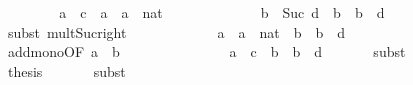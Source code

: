 \begin{isabellebody}
\isanewline
\ \ \ \ \isamarkupfalse%
\ \isamarkupfalse%
\ {}{\isacharcolon}{\kern0pt}\ {\isachardoublequoteopen}a\ {\isacharasterisk}{\kern0pt}\ c\ {\isacharequal}{\kern0pt}\ a\ {\isacharplus}{\kern0pt}\ a\ {\isacharasterisk}{\kern0pt}\ nat{\isachardoublequoteclose}\isanewline
\ \ \ \ \ \ \isacommand{{\isachardot}{\kern0pt}}\isamarkupfalse%
\isanewline
\isanewline
\ \ \ \ \isamarkupfalse%
\ {}{\isacharcolon}{\kern0pt}\ {\isachardoublequoteopen}b\ {\isacharasterisk}{\kern0pt}\ Suc\ d\ {\isacharequal}{\kern0pt}\ b\ {\isacharplus}{\kern0pt}\ b\ {\isacharasterisk}{\kern0pt}\ d{\isachardoublequoteclose}\isanewline
\ \ \ \ \ \ \isamarkupfalse%
\ {\isacharparenleft}{\kern0pt}subst\ mult{\isacharunderscore}{\kern0pt}Suc{\isacharunderscore}{\kern0pt}right{\isacharparenright}{\kern0pt}\isanewline
\ \ \ \ \ \ \isacommand{{\isachardot}{\kern0pt}{\isachardot}{\kern0pt}}\isamarkupfalse%
\isanewline
\isanewline
\ \ \ \ \isamarkupfalse%
\ {\isachardoublequoteopen}a\ {\isacharplus}{\kern0pt}\ a\ {\isacharasterisk}{\kern0pt}\ nat\ {\isasymle}\ b\ {\isacharplus}{\kern0pt}\ b\ {\isacharasterisk}{\kern0pt}\ d{\isachardoublequoteclose}\isanewline
\ \ \ \ \ \ \isamarkupfalse%
\ add{\isacharunderscore}{\kern0pt}mono{\isacharbrackleft}{\kern0pt}OF\ {\isacartoucheopen}a\ {\isasymle}\ b{\isacartoucheclose}\ {}{\isacharbrackright}{\kern0pt}\isanewline
\ \ \ \ \ \ \isacommand{{\isachardot}{\kern0pt}}\isamarkupfalse%
\isanewline
\isanewline
\ \ \ \ \isamarkupfalse%
\ \isamarkupfalse%
\ {\isachardoublequoteopen}a\ {\isacharasterisk}{\kern0pt}\ c\ {\isasymle}\ b\ {\isacharplus}{\kern0pt}\ b\ {\isacharasterisk}{\kern0pt}\ d{\isachardoublequoteclose}\isanewline
\ \ \ \ \ \ \isamarkupfalse%
{\isacharparenleft}{\kern0pt}subst\ {}{\isacharparenright}{\kern0pt}\isanewline
\ \ \ \ \ \ \isacommand{{\isachardot}{\kern0pt}}\isamarkupfalse%
\isanewline
\ \ \ \ \isamarkupfalse%
\ \isamarkupfalse%
\ {\isacharquery}{\kern0pt}thesis\isanewline
\ \ \ \ \ \ \isamarkupfalse%
{\isacharparenleft}{\kern0pt}subst\ {}{\isacharparenright}{\kern0pt}\isanewline
\ \ \ \ \ \ \isacommand{{\isachardot}{\kern0pt}}\isamarkupfalse%
\isanewline
\ \ \isamarkupfalse%
\isanewline
{}\isamarkupfalse%
%
\endisatagproof
{\isafoldproof}%
%
\isadelimproof
%
\endisadelimproof
\ \isanewline
\isanewline
\isanewline
\isanewline
%
\isadelimtheory
\isanewline
%
\endisadelimtheory
%
\isatagtheory
{}\isamarkupfalse%
%
\endisatagtheory
{\isafoldtheory}%
%
\isadelimtheory
%
\endisadelimtheory
%
\end{isabellebody}%
